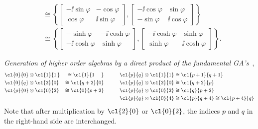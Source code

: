\begin{unit}
\begin{itemize}
\begin{align*}
 &\cong\left\{
\begin{bmatrix}-\ii\sin\varphi&-\cos\varphi\\ \cos\varphi& \ii\sin\varphi\end{bmatrix},
\begin{bmatrix}-\ii \cos\varphi&\sin\varphi\\ -\sin\varphi&\ii \cos\varphi\end{bmatrix}
\right\}\\
&\cong\left\{
\begin{bmatrix}-\sinh\varphi&-\ii\cosh\varphi\\ -\ii \cosh\varphi& \sinh\varphi\end{bmatrix},
\begin{bmatrix}-\ii \cosh\varphi&\sinh\varphi\\ \sinh\varphi& \ii \cosh\varphi\end{bmatrix}
\right\}.
\end{align*}
\end{itemize}
\end{unit}
%
\begin{unit}
\textit{Generation of higher order  algebras by a direct product
of the fundamental GA's}~\cite{Rausch05,Song2013}\label{isomorphismGeneration}, %
\begin{alignat*}{3}
  &\cl{0}{0}\otimes\cl{1}{1\,}&\cong\cl{1}{1\hphantom{+2}}&&\qquad\cl{p}{q}\otimes\cl{1}{1}&\cong\cl{p+1}{q+1}\\
&\cl{0}{q}\otimes\cl{2}{0}&\cong\cl{q+2}{0}&&\cl{p}{q}\otimes\cl{2}{0}&\cong\cl{q+2}{p}
\\
&\cl{p}{0}\otimes\cl{0}{2}&\cong\cl{0}{p+2}&&\cl{p}{q}\otimes\cl{0}{2}&\cong\cl{q}{p+2}
\\
& & && \cl{p}{q}\otimes\cl{0}{4}&\cong\cl{p}{q+4}\cong\cl{p+4}{q}
\end{alignat*}
Note that after multiplication by $\cl{2}{0}$ or $\cl{0}{2}$, the
indices $p$ and $q$ in the right-hand side are interchanged.
\end{unit}
%
